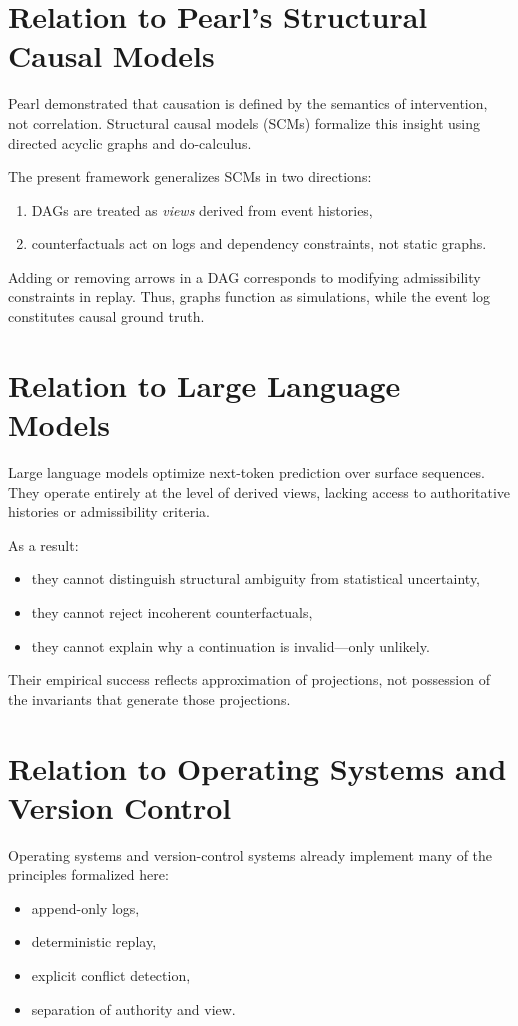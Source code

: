 \documentclass[11pt]{article}
\begin{document}
\section{Relation to Pearl’s Structural Causal Models}

Pearl demonstrated that causation is defined by the semantics of intervention, not correlation. Structural causal models (SCMs) formalize this insight using directed acyclic graphs and do-calculus.

The present framework generalizes SCMs in two directions:
\begin{enumerate}
  \item DAGs are treated as \emph{views} derived from event histories,
  \item counterfactuals act on logs and dependency constraints, not static graphs.
\end{enumerate}

Adding or removing arrows in a DAG corresponds to modifying admissibility constraints in replay. Thus, graphs function as simulations, while the event log constitutes causal ground truth.

\section{Relation to Large Language Models}

Large language models optimize next-token prediction over surface sequences. They operate entirely at the level of derived views, lacking access to authoritative histories or admissibility criteria.

As a result:
\begin{itemize}
  \item they cannot distinguish structural ambiguity from statistical uncertainty,
  \item they cannot reject incoherent counterfactuals,
  \item they cannot explain why a continuation is invalid—only unlikely.
\end{itemize}

Their empirical success reflects approximation of projections, not possession of the invariants that generate those projections.

\section{Relation to Operating Systems and Version Control}

Operating systems and version-control systems already implement many of the principles formalized here:
\begin{itemize}
  \item append-only logs,
  \item deterministic replay,
  \item explicit conflict detection,
  \item separation of authority and view.
\end{itemize}
\end{document}
